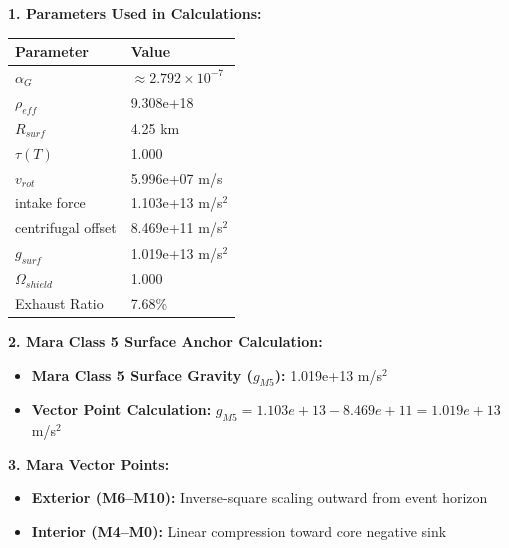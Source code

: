 \documentclass[11pt, a4paper]{article}
\begin{document}
\vspace{0.5em}
\noindent \textbf{1. Parameters Used in Calculations:}
\begin{center}
  \begin{tabular}{|l|l|}
    \hline
    \textbf{Parameter} & \textbf{Value} \\ \hline
    $\alpha_G$ & $\approx 2.792 \times 10^{-7}$ \\ \hline
    $\rho_{eff}$ & 9.308e+18 \\ \hline
    $R_{surf}$ & 4.25 km \\ \hline
    $\tau(T)$ & 1.000 \\ \hline
    $v_{rot}$ & 5.996e+07 m/s \\ \hline
    intake force & 1.103e+13 m/s$^2$ \\ \hline
    centrifugal offset & 8.469e+11 m/s$^2$ \\ \hline
    $g_{surf}$ & 1.019e+13 m/s$^2$ \\ \hline
    $\Omega_{shield}$ & 1.000 \\ \hline
    Exhaust Ratio & 7.68\% \\ \hline
  \end{tabular}
\end{center}

\vspace{0.5em}
\noindent \textbf{2. Mara Class 5 Surface Anchor Calculation:}
\begin{itemize}
  \item \textbf{Mara Class 5 Surface Gravity ($g_{M5}$):} 1.019e+13 m/s$^2$
  \item \textbf{Vector Point Calculation:} $g_{M5} = 1.103e+13 - 8.469e+11 = 1.019e+13$ m/s$^2$
\end{itemize}

\vspace{0.5em}
\noindent \textbf{3. Mara Vector Points:}
\begin{itemize}
  \item \textbf{Exterior (M6--M10):} Inverse-square scaling outward from event horizon
  \item \textbf{Interior (M4--M0):} Linear compression toward core negative sink
\end{itemize}
\end{document}
